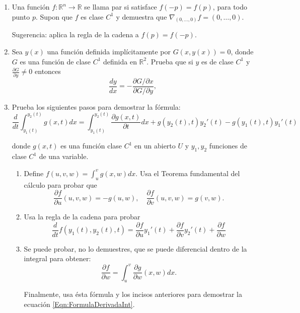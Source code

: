\documentclass{article}
\theoremstyle{definition}
\begin{document}
\begin{enumerate}
  
\item Una funci\'on $f:\mathbb{R}^n \to \mathbb{R}$ se llama par si
satisface $f(-p)=f(p)$, para todo punto  $p$. Supon que $f$ es clase
$C^1$ y demuestra que  $\nabla_{(0,\dots, 0)}f=(0,\dots, 0)$.

Sugerencia: aplica la regla de la cadena a $f(p)=f(-p)$. 



\item Sea $y(x)$ una funci\'on definida impl\'icitamente por $G(x,y(x))=0$,
  donde $G$ es una funci\'on de clase $C^1$ definida en $\mathbb{R}^2$.
  Prueba que si $y$ es de clase
  $C^1$  y  $\frac{\partial G}{\partial y}\ne 0$ entonces
  $$
  \frac{dy}{dx}=-\frac{ \partial G/ \partial x}{\partial G/\partial y}, 
  $$



\item Prueba los siguientes pasos para demostrar la  f\'ormula:
  \begin{equation}\label{Eqn:FormulaDerivadaInt}
  \frac{d}{dt} \int_{y_1(t)}^{y_2(t)}g(x,t)dx=
  \int_{y_1(t)}^{y_2(t)}\frac{\partial g(x,t)}{\partial t}dx+ g(y_2(t),t)y_2'(t)
  -g(y_1(t),t)y_1'(t)
  \end{equation}

  donde $g(x,t)$ es una funci\'on clase $C^1$ en un abierto $U$
  y $y_1,y_2$ funciones de clase $C^1$ de una variable.

  \begin{enumerate}
  \item Define $f(u,v,w)=\int_u^v g(x,w)dx$. Usa el Teorema fundamental
    del c\'alculo para probar que
    $$
    \frac{\partial f}{\partial u}(u,v,w)=-g(u,w),
    \quad \frac{\partial f}{\partial v}(u,v,w)=g(v,w).
    $$

  \item Usa la regla de la cadena para probar
    $$
    \frac{d}{dt} f(y_1(t),y_2(t),t)= \frac{\partial f}{\partial u}
    y_1'(t)+ \frac{\partial f}{\partial v}y_2'(t)
    +\frac{\partial f}{\partial w}
    $$

  \item Se puede probar, no lo demuestres, que se puede diferencial
    dentro  de la integral para obtener:
    $$
    \frac{\partial f}{\partial w}=\int_{u}^v
    \frac{\partial g}{\partial w}(x,w)dx.
    $$

    Finalmente, usa \'esta f\'ormula y los incisos anteriores
    para demostrar la ecuaci\'on \eqref{Eqn:FormulaDerivadaInt}. 
  \end{enumerate}
  
  
\end{enumerate}

  
       
\end{document}
